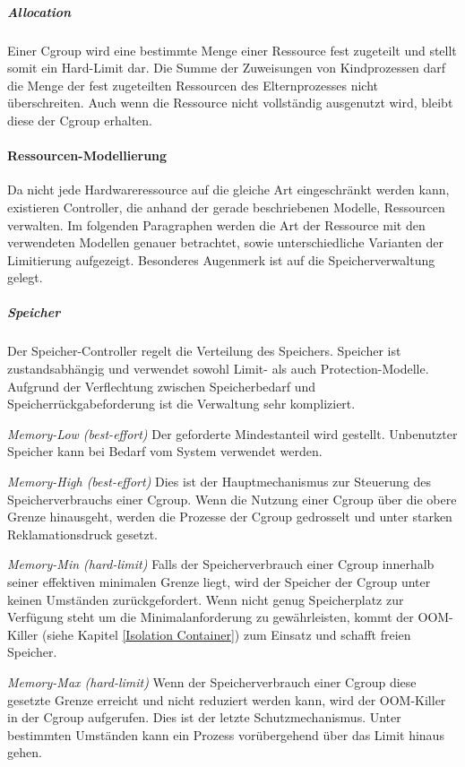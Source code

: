 \subparagraph{Allocation}
Einer Cgroup wird eine bestimmte Menge einer Ressource fest zugeteilt und stellt somit ein Hard-Limit dar. Die Summe der Zuweisungen von Kindprozessen darf die Menge der fest zugeteilten Ressourcen des Elternprozesses nicht überschreiten. Auch wenn die Ressource nicht vollständig ausgenutzt wird, bleibt diese der Cgroup erhalten. 


\paragraph{Ressourcen-Modellierung}
Da nicht jede Hardwareressource auf die gleiche Art eingeschränkt werden kann, existieren Controller, die anhand der gerade beschriebenen Modelle, Ressourcen verwalten. Im folgenden Paragraphen werden die Art der Ressource mit den verwendeten Modellen genauer betrachtet, sowie unterschiedliche Varianten der Limitierung aufgezeigt. Besonderes Augenmerk ist auf die Speicherverwaltung gelegt.

\subparagraph{Speicher}
Der Speicher-Controller regelt die Verteilung des Speichers. Speicher ist zustandsabhängig und verwendet sowohl Limit- als auch Protection-Modelle. Aufgrund der Verflechtung zwischen Speicherbedarf und Speicherrückgabeforderung ist die Verwaltung sehr kompliziert.

\emph{Memory-Low (best-effort)}
Der geforderte Mindestanteil wird gestellt. Unbenutzter Speicher kann bei Bedarf vom System verwendet werden.

\emph{Memory-High (best-effort)}
Dies ist der Hauptmechanismus zur Steuerung des Speicherverbrauchs einer Cgroup. Wenn die Nutzung einer Cgroup über die obere Grenze hinausgeht, werden die Prozesse der Cgroup gedrosselt und unter starken Reklamationsdruck gesetzt.

\emph{Memory-Min (hard-limit)}
Falls der Speicherverbrauch einer Cgroup innerhalb seiner effektiven minimalen Grenze liegt, wird der Speicher der Cgroup unter keinen Umständen zurückgefordert. Wenn nicht genug Speicherplatz zur Verfügung steht um die Minimalanforderung zu gewährleisten, kommt der OOM-Killer (siehe Kapitel \ref{Isolation Container}) zum Einsatz und schafft freien Speicher.

\emph{Memory-Max (hard-limit)}
Wenn der Speicherverbrauch einer Cgroup diese gesetzte Grenze erreicht und nicht reduziert werden kann, wird der OOM-Killer in der Cgroup aufgerufen. Dies ist der letzte Schutzmechanismus. Unter bestimmten Umständen kann ein Prozess vorübergehend über das Limit hinaus gehen.

